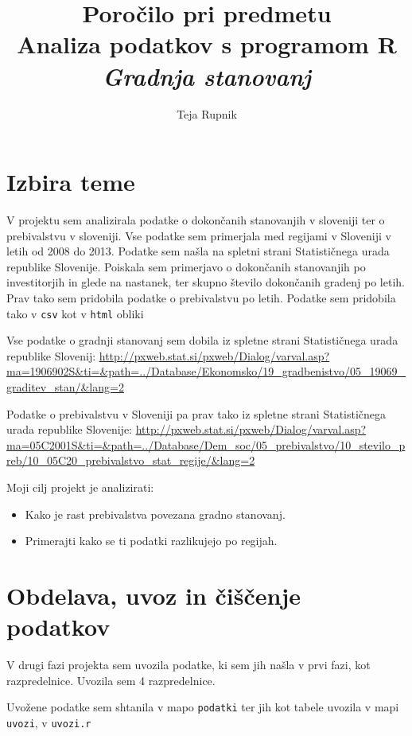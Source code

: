 \documentclass[11pt,a4paper]{article}
\begin{document}
\title{Poročilo pri predmetu \\
Analiza podatkov s programom R\\
\vspace{15mm}
\textbf{\emph{Gradnja stanovanj}}}
\author{Teja Rupnik}
\maketitle

\newpage
\section{Izbira teme}
V projektu sem analizirala podatke o dokončanih stanovanjih v sloveniji ter o prebivalstvu v sloveniji. Vse podatke sem primerjala med regijami v Sloveniji v letih od 2008 do 2013. Podatke sem našla na spletni strani Statističnega urada republike Slovenije. Poiskala sem primerjavo o dokončanih stanovanjih po investitorjih in glede na nastanek, ter skupno število dokončanih gradenj po letih. Prav tako sem pridobila podatke o prebivalstvu po letih. Podatke sem pridobila tako v \verb|csv| kot v  \verb|html| obliki

Vse podatke o gradnji stanovanj sem dobila iz spletne strani Statističnega urada republike Slovenij:
\url{http://pxweb.stat.si/pxweb/Dialog/varval.asp?ma=1906902S&ti=&path=../Database/Ekonomsko/19_gradbenistvo/05_19069_graditev_stan/&lang=2}

Podatke o prebivalstvu v Sloveniji pa prav tako iz spletne strani Statističnega urada republike Slovenije:
\url{http://pxweb.stat.si/pxweb/Dialog/varval.asp?ma=05C2001S&ti=&path=../Database/Dem_soc/05_prebivalstvo/10_stevilo_preb/10_05C20_prebivalstvo_stat_regije/&lang=2}

Moji cilj projekt je analizirati:
\begin{itemize}
\item{Kako je rast prebivalstva povezana gradno stanovanj.} 
\item{Primerajti kako se ti podatki razlikujejo po regijah.}
\end{itemize}

\newpage
\section{Obdelava, uvoz in čiščenje podatkov}
V drugi fazi projekta sem uvozila podatke, ki sem jih našla v prvi fazi, kot razpredelnice. Uvozila sem 4 razpredelnice.

Uvožene podatke sem shtanila v mapo \verb|podatki| ter jih kot tabele uvozila v mapi \verb|uvozi|, v \verb|uvozi.r|
\end{document}
